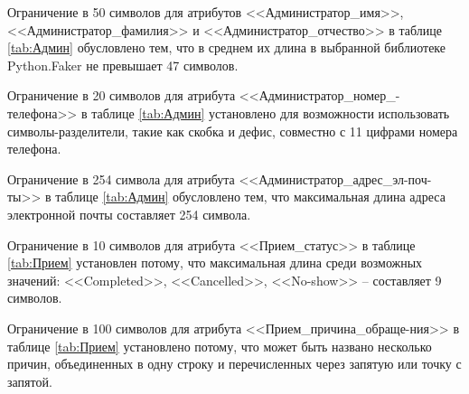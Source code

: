 \documentclass[a4paper]{article}
\begin{document}
Ограничение в 50 символов для атрибутов <<Администратор\_имя>>, <<Администратор\_фамилия>> и <<Администратор\_отчество>> в таблице \ref{tab:Админ} обусловлено тем, что в среднем их длина в выбранной библиотеке Python.Faker не превышает 47 символов. 

Ограничение в 20 символов для атрибута <<Администратор\_номер\_-телефона>> в таблице \ref{tab:Админ} установлено для возможности использовать символы-разделители, такие как скобка и дефис, совместно с 11 цифрами номера телефона.

Ограничение в 254 символа для атрибута <<Администратор\_адрес\_эл-поч-ты>> в таблице \ref{tab:Админ} обусловлено тем, что максимальная длина адреса электронной почты составляет 254 символа. 

\begin{table}[H]
  \caption{Администратор - administrator}
  \label{tab:Админ}
\end{table}

Ограничение в 10 символов для атрибута <<Прием\_статус>> в таблице \ref{tab:Прием} установлен потому, что максимальная длина среди возможных значений: <<Completed>>, <<Cancelled>>, <<No-show>> -- составляет 9 символов.

Ограничение в 100 символов для атрибута <<Прием\_причина\_обраще-ния>> в таблице \ref{tab:Прием} установлено потому, что может быть названо несколько причин, объединенных в одну строку и перечисленных через запятую или точку с запятой.
\end{document}
